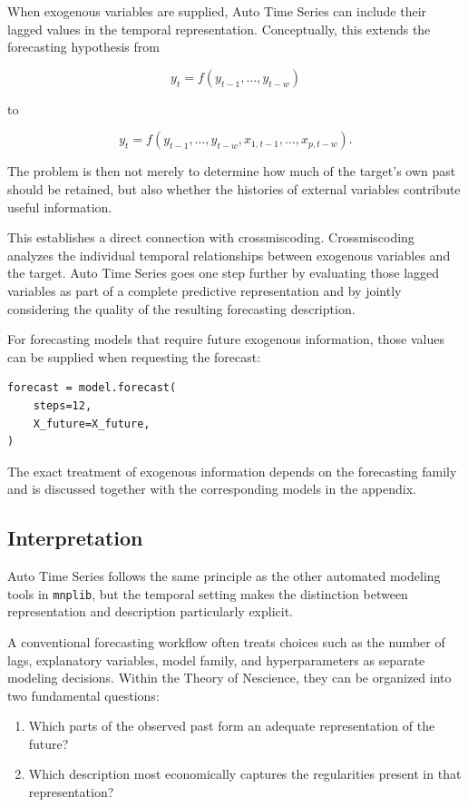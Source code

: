 When exogenous variables are supplied, Auto Time Series can include their
lagged values in the temporal representation. Conceptually, this extends the
forecasting hypothesis from

\[
y_t
=
f(y_{t-1},\ldots,y_{t-w})
\]

to

\[
y_t
=
f(
y_{t-1},\ldots,y_{t-w},
x_{1,t-1},\ldots,x_{p,t-w}
).
\]

The problem is then not merely to determine how much of the target's own past
should be retained, but also whether the histories of external variables
contribute useful information.

This establishes a direct connection with crossmiscoding. Crossmiscoding
analyzes the individual temporal relationships between exogenous variables and
the target. Auto Time Series goes one step further by evaluating those lagged
variables as part of a complete predictive representation and by jointly
considering the quality of the resulting forecasting description.

For forecasting models that require future exogenous information, those values
can be supplied when requesting the forecast:

\begin{sourcecode}
{\scriptsize
\begin{verbatim}
forecast = model.forecast(
    steps=12,
    X_future=X_future,
)
\end{verbatim}}
\end{sourcecode}

The exact treatment of exogenous information depends on the forecasting family
and is discussed together with the corresponding models in the appendix.

\subsection*{Interpretation}

Auto Time Series follows the same principle as the other automated modeling
tools in \texttt{mnplib}, but the temporal setting makes the distinction between
representation and description particularly explicit.

A conventional forecasting workflow often treats choices such as the number of
lags, explanatory variables, model family, and hyperparameters as separate
modeling decisions. Within the Theory of Nescience, they can be organized into
two fundamental questions:

\begin{enumerate}
    \item Which parts of the observed past form an adequate representation of
          the future?
    \item Which description most economically captures the regularities present
          in that representation?
\end{enumerate}

